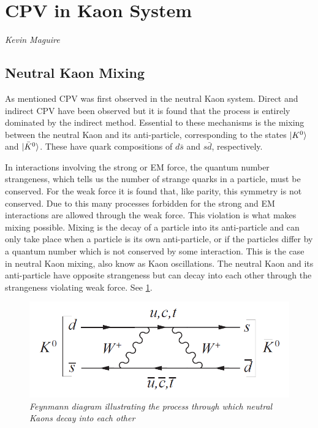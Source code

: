 \section{CPV in Kaon System} 
\vspace{-1.0em}
\begin{center}
\tiny{\textit{Kevin Maguire}}
\end{center}

\subsection{Neutral Kaon Mixing}

As mentioned CPV was first observed in the neutral Kaon system. Direct and indirect CPV have been observed but it is found that the process is entirely dominated by the indirect method. Essential to these mechanisms is the mixing between the neutral Kaon and its anti-particle, corresponding to the states $\ket{K^{0}}$ and $\ket{\bar{K}^{0}}$. These have quark compositions of $d \bar{s}$ and $s \bar{d}$, respectively. 

In interactions involving the strong or EM force, the quantum number strangeness, which tells us the number of strange quarks in a particle, must be conserved. For the weak force it is found that, like parity, this symmetry is not conserved. Due to this many processes forbidden for the strong and EM interactions are allowed through the weak force. This violation is what makes mixing possible. Mixing is the decay of a particle into its anti-particle and can only take place when a particle is its own anti-particle, or if the particles differ by a quantum number which is not conserved by some interaction. This is the case in neutral Kaon mixing, also know as Kaon oscillations. The neutral Kaon and its anti-particle have opposite strangeness but can decay into each other through the strangeness violating weak force. See \cref{KaonMixinFeyn}. 

\begin{figure}[h!]
\begin{center}
\includegraphics[scale=0.4]{figs/KevFeyn1.png}
\end{center}
\caption{\textit{Feynmann diagram illustrating the process through which neutral Kaons decay into each other}}
\label{KaonMixinFeyn}
\end{figure}

